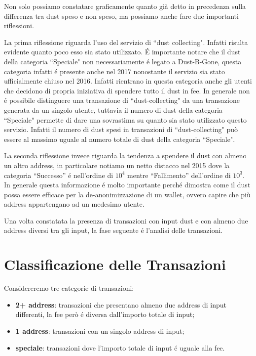 Non solo possiamo constatare graficamente quanto già detto in precedenza sulla differenza tra dust speso e non speso, ma possiamo anche fare due importanti riflessioni. 

La prima riflessione riguarda l'uso del servizio di ``dust collecting". Infatti risulta evidente quanto poco esso sia stato utilizzato. É importante notare che il dust della categoria ``Speciale" non necessariamente é legato a Dust-B-Gone, questa categoria infatti é presente anche nel 2017 nonostante il servizio sia stato ufficialmente chiuso nel 2016. Infatti rientrano in questa categoria anche gli utenti che decidono di propria iniziativa di spendere tutto il dust in fee. In generale non é possibile distinguere una transazione di ``dust-collecting" da una transazione generata da un singolo utente, tuttavia il numero di dust della categoria ``Speciale" permette di dare una sovrastima su quanto sia stato utilizzato questo servizio. Infatti il numero di dust spesi in transazioni di ``dust-collecting" può essere al massimo uguale al numero totale di dust della categoria ``Speciale".  

La seconda riflessione invece riguarda la tendenza a spendere il dust con almeno un altro address, in particolare notiamo un netto distacco nel 2015 dove la categoria ``Successo'' é nell’ordine di $10^4$ mentre ``Fallimento'' dell’ordine di $10^3$. In generale questa informazione é molto importante perché dimostra come il dust possa essere efficace per la de-anonimizzazione di un wallet, ovvero capire che più address appartengano ad un medesimo utente.

Una volta constatata la presenza di transazioni con input dust e con almeno due address diversi tra gli input, la fase seguente é l'analisi delle transazioni.

\section{Classificazione delle Transazioni}
Considereremo tre categorie di transazioni: 
\begin{itemize}
    \item \textbf{2+ address}: transazioni che presentano almeno due address di input differenti, la fee però é diversa dall'importo totale di input;
    \item \textbf{1 address}: transazioni con un singolo address di input;
    \item \textbf{speciale}: transazioni dove l'importo totale di input é uguale alla fee.
\end{itemize}

